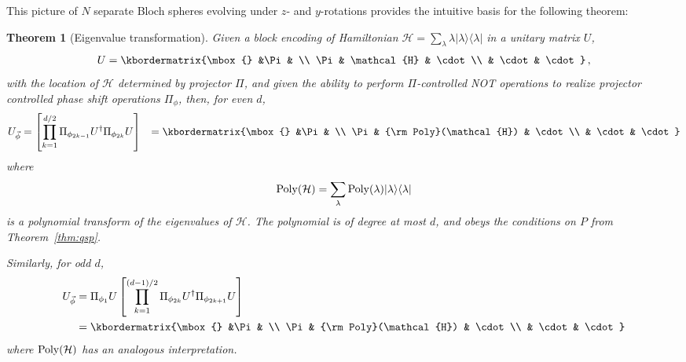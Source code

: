 \documentclass[aps,pra,showpacs,notitlepage,twocolumn,superscriptaddress,nofootinbib]{revtex4-1}
\newtheorem{theorem}{Theorem}
\def\>{\rangle}
\def\<{\langle}
\newcommand{\bea}{\begin{eqnarray}}
\newcommand{\eea}{\end{eqnarray}}
\newcommand{\be}{\begin{equation}}
\newcommand{\ee}{\end{equation}}
\begin{document}
This picture of $N$ separate Bloch spheres evolving under $z$- and $y$-rotations provides the intuitive basis for the following theorem:
    \begin{theorem}[Eigenvalue transformation]
    Given a block encoding of Hamiltonian $\mathcal{H} = \sum_\lambda \lambda |\lambda\>\<\lambda|$ in a unitary matrix $U$,
        \bea
            U = \kbordermatrix{\mbox{} &\Pi &  \\
            \Pi & \mathcal{H}     & \cdot \\ 
            & \cdot & \cdot 
            }
            \,,
        \eea
    with the location of $\mathcal{H}$ determined by projector $\Pi$, and given the ability to perform $\Pi$-controlled NOT operations to realize projector controlled phase shift operations $\Pi_\phi$, then, for even $d$,
        \begin{align}\label{eq:thm_eigenvalue_transform}
            \begin{aligned}
                U_{\vec\phi} &= 
                \left[ \prod_{k=1}^{d/2} \Pi_{\phi_{2k-1}} U^\dagger \Pi_{\phi_{2k}}  U  \right] 
            &= \kbordermatrix{\mbox{} &\Pi &  \\
            \Pi & {\rm Poly}(\mathcal{H})     & \cdot \\ 
                & \cdot & \cdot 
          }
            \end{aligned}
        \end{align}
    where
        \be
            {\rm Poly}(\mathcal{H}) = \sum_\lambda {\rm Poly}(\lambda) |\lambda\>\<\lambda|
        \ee
    is a polynomial transform of the eigenvalues of $\mathcal{H}$. The polynomial is of degree at most $d$, and obeys the conditions on $P$ from Theorem~\ref{thm:qsp}. 
      
    Similarly, for odd $d$,
        \begin{align}\label{eq:thm_eigenvalue_transform_odd}
            \begin{aligned}
                U_{\vec\phi} &= 
                \Pi_{\phi_{1}}  U \left[ \prod_{k=1}^{(d-1)/2} \Pi_{\phi_{2k}} U^\dagger \Pi_{\phi_{2k+1}}  U  \right] 
                \\ &= \kbordermatrix{\mbox{} &\Pi &  \\
                \Pi & {\rm Poly}(\mathcal{H})     & \cdot \\ 
                & \cdot & \cdot 
                }
            \end{aligned}
        \end{align}
    where ${\rm Poly}(\mathcal{H})$ has an analogous interpretation. 
    \label{thm:eigenvalue_transform}
    \end{theorem}
\end{document}

